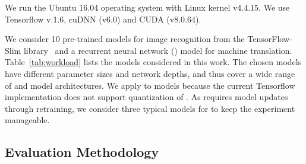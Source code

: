  We run the Ubuntu 16.04 operating system with Linux kernel v4.4.15. We use Tensorflow v.1.6, cuDNN (v6.0) and
CUDA (v8.0.64).


 We consider 10 pre-trained \CNN models for image recognition from the TensorFlow-Slim
library~\cite{silberman2013tensorflow} and a recurrent neural network (\RNN) model for machine translation. Table~\ref{tab:workload} lists
the models considered in this work. The chosen models have different parameter sizes and network depths, and thus cover a wide range of
\CNN and \RNN model architectures. We apply \dquantization to \CNN models because the current Tensorflow implementation does not support
quantization of \RNNs. As \pruning requires model updates through retraining, we consider three typical models for \pruning to keep the
experiment manageable.





\subsection{Evaluation Methodology \label{sec:method}}

